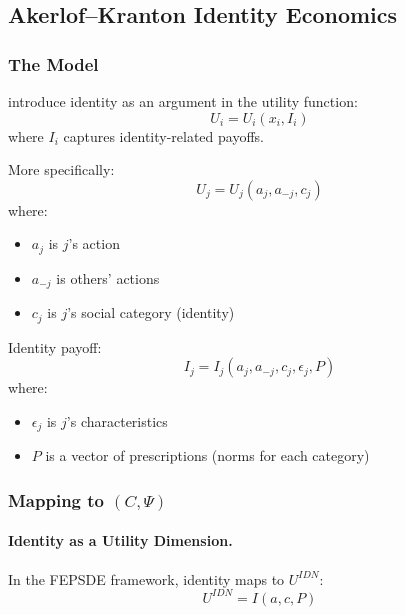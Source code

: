 \subsection{Akerlof--Kranton Identity Economics}
\label{app:akerlofkranton}

\subsubsection{The Model}

\citet{akerlofkranton} introduce identity as an argument in the utility function:
\begin{equation}
  U_i = U_i(x_i, I_i)
  \label{eq:akidentity}
\end{equation}
where $I_i$ captures identity-related payoffs.

More specifically:
\begin{equation}
  U_j = U_j(a_j, a_{-j}, c_j)
\end{equation}
where:
\begin{itemize}
  \item $a_j$ is $j$'s action
  \item $a_{-j}$ is others' actions
  \item $c_j$ is $j$'s social category (identity)
\end{itemize}

Identity payoff:
\begin{equation}
  I_j = I_j(a_j, a_{-j}, c_j, \epsilon_j, P)
\end{equation}
where:
\begin{itemize}
  \item $\epsilon_j$ is $j$'s characteristics
  \item $P$ is a vector of prescriptions (norms for each category)
\end{itemize}

\subsubsection{Mapping to $(C, \Psi)$}

\paragraph{Identity as a Utility Dimension.}
In the FEPSDE framework, identity maps to $U^{IDN}$:
\begin{equation}
  U^{IDN} = I(a, c, P)
\end{equation}


